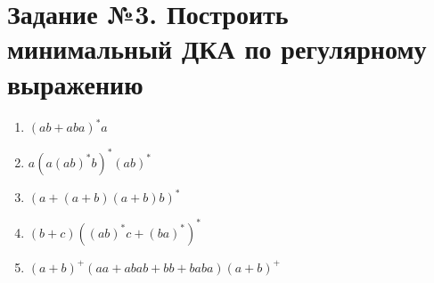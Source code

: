 \documentclass{article}
\begin{document}
\section{Задание №3. Построить минимальный ДКА
по регулярному выражению}
\begin{enumerate}
    \item \((ab + aba)^{*}a\) \\
    
    \begin{center}
    \end{center}
    
    \item \(a(a(ab)^{*}b)^{*}(ab)^{*}\) \\
    
    \begin{center}
    \end{center}
    
    \item \((a + (a + b)(a + b)b)^*\) \\
    
    \begin{center}
    \end{center}
    
    \item \((b+c)((ab)^*c + (ba)^*)^*\) \\
    
    \begin{center}
    \end{center}
    
    \item \((a+b)^+(aa + abab + bb + baba)(a+b)^+\) \\
    
    \begin{center}
    \end{center}
\end{enumerate}
\end{document}

